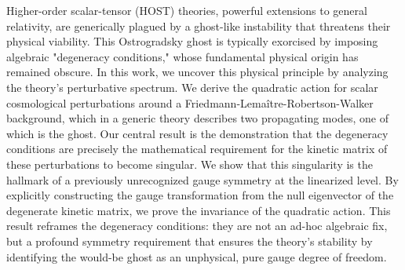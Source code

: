 \documentclass[twocolumn]{aastex631}
\begin{document}
Higher-order scalar-tensor (HOST) theories, powerful extensions to general relativity, are generically plagued by a ghost-like instability that threatens their physical viability. This Ostrogradsky ghost is typically exorcised by imposing algebraic "degeneracy conditions," whose fundamental physical origin has remained obscure. In this work, we uncover this physical principle by analyzing the theory's perturbative spectrum. We derive the quadratic action for scalar cosmological perturbations around a Friedmann-Lemaître-Robertson-Walker background, which in a generic theory describes two propagating modes, one of which is the ghost. Our central result is the demonstration that the degeneracy conditions are precisely the mathematical requirement for the kinetic matrix of these perturbations to become singular. We show that this singularity is the hallmark of a previously unrecognized gauge symmetry at the linearized level. By explicitly constructing the gauge transformation from the null eigenvector of the degenerate kinetic matrix, we prove the invariance of the quadratic action. This result reframes the degeneracy conditions: they are not an ad-hoc algebraic fix, but a profound symmetry requirement that ensures the theory's stability by identifying the would-be ghost as an unphysical, pure gauge degree of freedom.
\end{document}
